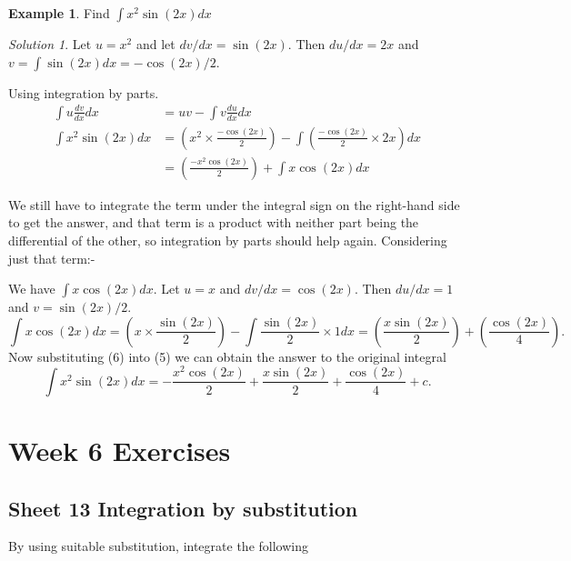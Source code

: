 \documentclass[
  11pt,
  oneside]{book}
\newcommand{\slide}{}
\theoremstyle{definition}
\theoremstyle{definition}
\newtheorem{example}{Example}[chapter]
\theoremstyle{definition}
\theoremstyle{definition}
\theoremstyle{remark}
\newtheorem*{solution}{Solution}
\begin{document}
\begin{example}
Find \(\displaystyle\int x^2\sin(2x)dx\)
\end{example}

\begin{solution}
Let \(u = x^2\) and let \(dv/dx = \sin(2x)\). Then \(du/dx = 2x\) and \(v = \displaystyle\int \sin(2x)dx = -\cos(2x)/2\).

Using integration by parts.
\begin{align*}
\int u\frac{dv}{dx}dx& = uv-\int v\frac{du}{dx}dx\\
\int x^2\sin(2x)dx&=\left(x^2\times\frac{-\cos(2x)}{2}\right)-\int\left(\frac{-\cos(2x)}{2}\times2x\right)dx\\
&=\left(\frac{-x^2\cos(2x)}{2}\right)+\int x\cos(2x)dx\tag{5}
\end{align*}

We still have to integrate the term under the integral sign on the right-hand side to get the answer, and that term is a product with neither part being the differential of the other, so integration by parts should help again. Considering just that term:-

\slide

We have \(\displaystyle\int x\cos(2x)dx\). Let \(u=x\) and \(dv/dx = \cos(2x)\). Then \(du/dx = 1\) and \(v=\sin(2x)/2\).
\[
\int x\cos(2x)dx = \left(x\times\frac{\sin(2x)}{2}\right) - \int\frac{\sin(2x)}{2}\times1dx = \left(\frac{x\sin(2x)}2\right)+\left(\frac{\cos(2x)}4\right)\tag{6}.
\]
Now substituting (6) into (5) we can obtain the answer to the original integral
\[
\int x^2\sin(2x)dx = -\frac{x^2\cos(2x)}2+\frac{x\sin(2x)}2+\frac{\cos(2x)}4 + c.
\]
\end{solution}

\chapter*{Week 6 Exercises}\label{week-6-exercises}

\section{Sheet 13 Integration by substitution}\label{sheet-13-integration-by-substitution}

By using suitable substitution, integrate the following
\end{document}
